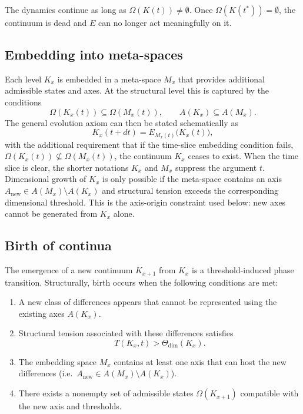 The dynamics continue as long as \(\Omega(K(t)) \neq \emptyset\).
Once \(\Omega(K(t^\ast)) = \emptyset\), the continuum is dead and \(E\) can no longer act meaningfully on it.

\subsection{Embedding into meta-spaces}

Each level \(K_x\) is embedded in a meta-space \(M_x\) that provides additional admissible states and axes.
At the structural level this is captured by the conditions
\[
    \Omega(K_x(t)) \subseteq \Omega(M_x(t)), \qquad
    A(K_x) \subseteq A(M_x).
\]
The general evolution axiom can then be stated schematically as
\[
    K_x(t+dt) = E_{M_x(t)}\big(K_x(t)\big),
\]
with the additional requirement that if the time-slice embedding condition
fails, \(\Omega(K_x(t))\not\subseteq\Omega(M_x(t))\), the continuum \(K_x\)
ceases to exist. When the time slice is clear, the shorter notations \(K_x\)
and \(M_x\) suppress the argument \(t\).
Dimensional growth of \(K_x\) is only possible if the meta-space contains an
axis \(A_{\mathrm{new}}\in A(M_x)\setminus A(K_x)\) and structural tension
exceeds the corresponding dimensional threshold. This is the axis-origin
constraint used below: new axes cannot be generated from \(K_x\) alone.

\subsection{Birth of continua}

The emergence of a new continuum \(K_{x+1}\) from \(K_x\) is a threshold-induced phase transition.
Structurally, birth occurs when the following conditions are met:

\begin{enumerate}
    \item A new class of differences appears that cannot be represented using the existing axes \(A(K_x)\).
    \item Structural tension associated with these differences satisfies
          \[
              T(K_x,t) > \Theta_{\mathrm{dim}}(K_x).
          \]
    \item The embedding space \(M_x\) contains at least one axis that can host the new differences (i.e.\ \(A_{\mathrm{new}} \in A(M_x) \setminus A(K_x)\)).
    \item There exists a nonempty set of admissible states \(\Omega(K_{x+1})\) compatible with the new axis and thresholds.
\end{enumerate}

